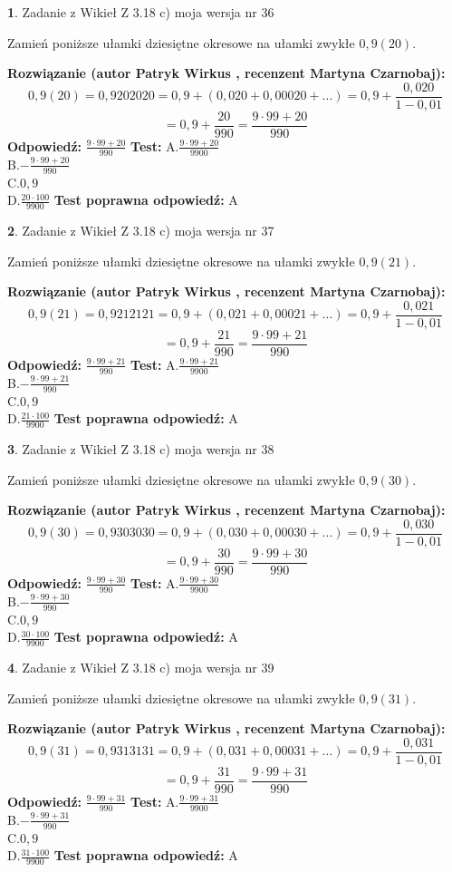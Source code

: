 \documentclass[12pt, a4paper]{article}
\theoremstyle{definition} %
\newtheorem{zad}{}
\newcommand{\zadStart}[1]{\begin{zad}#1\newline}
\newcommand{\zadStop}{\end{zad}}
\newcommand{\rozwStart}[2]{\noindent \textbf{Rozwiązanie (autor #1 , recenzent #2): }\newline}
\newcommand{\rozwStop}{\newline}
\newcommand{\odpStart}{\noindent \textbf{Odpowiedź:}\newline}
\newcommand{\odpStop}{\newline}
\newcommand{\testStart}{\noindent \textbf{Test:}\newline}
\newcommand{\testStop}{\newline}
\newcommand{\kluczStart}{\noindent \textbf{Test poprawna odpowiedź:}\newline}
\newcommand{\kluczStop}{\newline}
\begin{document}
\zadStart{Zadanie z Wikieł Z 3.18 c) moja wersja nr 36}

Zamień poniższe ułamki dziesiętne okresowe na ułamki zwykłe $0,9(20)$.
\zadStop
\rozwStart{Patryk Wirkus}{Martyna Czarnobaj}
$$0,9(20)=0,9202020=0,9+(0,020+0,00020+...)=0,9+\frac{0,020}{1-0,01}$$
$$=0,9+\frac{20}{990}=\frac{9\cdot99+20}{990}$$
\rozwStop
\odpStart
$\frac{9\cdot99+20}{990}$
\odpStop
\testStart
A.$\frac{9\cdot99+20}{9900}$\\ B.$-\frac{9\cdot99+20}{990}$\\ C.$0,9$\\ D.$\frac{20\cdot100}{9900}$
\testStop
\kluczStart
A
\kluczStop



\zadStart{Zadanie z Wikieł Z 3.18 c) moja wersja nr 37}

Zamień poniższe ułamki dziesiętne okresowe na ułamki zwykłe $0,9(21)$.
\zadStop
\rozwStart{Patryk Wirkus}{Martyna Czarnobaj}
$$0,9(21)=0,9212121=0,9+(0,021+0,00021+...)=0,9+\frac{0,021}{1-0,01}$$
$$=0,9+\frac{21}{990}=\frac{9\cdot99+21}{990}$$
\rozwStop
\odpStart
$\frac{9\cdot99+21}{990}$
\odpStop
\testStart
A.$\frac{9\cdot99+21}{9900}$\\ B.$-\frac{9\cdot99+21}{990}$\\ C.$0,9$\\ D.$\frac{21\cdot100}{9900}$
\testStop
\kluczStart
A
\kluczStop



\zadStart{Zadanie z Wikieł Z 3.18 c) moja wersja nr 38}

Zamień poniższe ułamki dziesiętne okresowe na ułamki zwykłe $0,9(30)$.
\zadStop
\rozwStart{Patryk Wirkus}{Martyna Czarnobaj}
$$0,9(30)=0,9303030=0,9+(0,030+0,00030+...)=0,9+\frac{0,030}{1-0,01}$$
$$=0,9+\frac{30}{990}=\frac{9\cdot99+30}{990}$$
\rozwStop
\odpStart
$\frac{9\cdot99+30}{990}$
\odpStop
\testStart
A.$\frac{9\cdot99+30}{9900}$\\ B.$-\frac{9\cdot99+30}{990}$\\ C.$0,9$\\ D.$\frac{30\cdot100}{9900}$
\testStop
\kluczStart
A
\kluczStop



\zadStart{Zadanie z Wikieł Z 3.18 c) moja wersja nr 39}

Zamień poniższe ułamki dziesiętne okresowe na ułamki zwykłe $0,9(31)$.
\zadStop
\rozwStart{Patryk Wirkus}{Martyna Czarnobaj}
$$0,9(31)=0,9313131=0,9+(0,031+0,00031+...)=0,9+\frac{0,031}{1-0,01}$$
$$=0,9+\frac{31}{990}=\frac{9\cdot99+31}{990}$$
\rozwStop
\odpStart
$\frac{9\cdot99+31}{990}$
\odpStop
\testStart
A.$\frac{9\cdot99+31}{9900}$\\ B.$-\frac{9\cdot99+31}{990}$\\ C.$0,9$\\ D.$\frac{31\cdot100}{9900}$
\testStop
\kluczStart
A
\kluczStop
\end{document}
